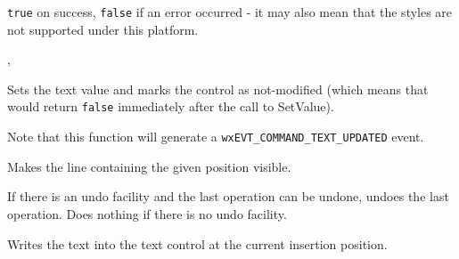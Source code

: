 


{\tt true} on success, {\tt false} if an error occurred - it may also mean that
the styles are not supported under this platform.


, 


\label{wxtextctrlsetvalue}


Sets the text value and marks the control as not-modified (which means that
 would return {\tt false} immediately
after the call to SetValue).

Note that this function will generate a {\tt wxEVT\_COMMAND\_TEXT\_UPDATED}
event.




\label{wxtextctrlshowposition}


Makes the line containing the given position visible.




\label{wxtextctrlundo}


If there is an undo facility and the last operation can be undone, undoes the last operation. Does nothing
if there is no undo facility.


\label{wxtextctrlwritetext}


Writes the text into the text control at the current insertion position.



